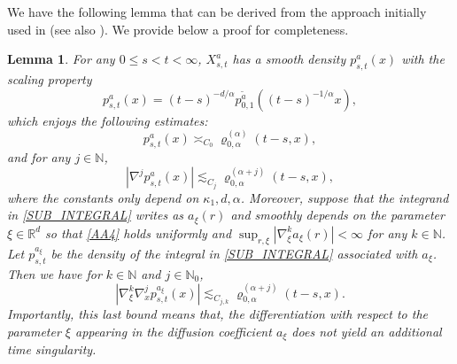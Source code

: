 \documentclass[11pt]{article}
\numberwithin{equation}{section}\providecommand{\asymp}{\mathrel{\sim}}
\theoremstyle{plain}
\newtheorem{lemma}[theorem]{Lemma}
\theoremstyle{definition}
\newcommand\mN{\mathbb{N}}
\newcommand\mR{\mathbb{R}}
\newcommand\1{{\mathbf{1}}}
\begin{document}
We have the following lemma that can be derived from the approach initially used in \cite{Be} (see also
\cite{Bo-Ja}).
We provide below a proof for completeness.
\begin{lemma}\label{Le27}
For any $0\leq s<t<\infty$, $X^a_{s,t}$ has a smooth density $p_{s,t}^{a}(x)$ with the scaling property
\begin{equation}\label{SC0}
p_{s,t}^{a}(x)=(t-s)^{-d/\alpha} p_{0,1}^{\tilde a}((t-s)^{-1/\alpha}x),
\end{equation}
which enjoys the following estimates:
\begin{equation}
p_{s,t}^{a}(x)\asymp_{C_0}\varrho^{(\alpha)}_{0,\alpha}(t-s,x),\label{Es0}
\end{equation}
and for any $j\in\mN$,
\begin{equation}
|\nabla^j p_{s,t}^{a}(x)|\lesssim_{C_j}\varrho^{(\alpha+j)}_{0,\alpha}(t-s,x),\label{Es2}
\end{equation}
where the constants only depend on $\kappa_1,d,\alpha$. Moreover, suppose that the integrand in \eqref{SUB_INTEGRAL} writes as $a_\xi(r)$ and smoothly depends on the parameter $\xi\in\mR^d$ so that \eqref{AA4} holds uniformly and
$\sup_{r,\xi}|\nabla^k_\xi a_\xi(r)|<\infty$ for any $k\in\mN$.
Let $p_{s,t}^{a_\xi}$ be the density of the integral in \eqref{SUB_INTEGRAL} associated with $a_\xi$. Then we have
for $k\in\mN$ and $j\in\mN_0$,
\begin{equation}
|\nabla^k_\xi\nabla^j_x p_{s,t}^{a_\xi}(x)|\lesssim_{C_{j,k}} \varrho^{(\alpha+j)}_{0,\alpha}(t-s,x).\label{Es22}
\end{equation}
Importantly, this last bound means that, the differentiation with respect to the parameter $\xi $ appearing in the \textit{diffusion} coefficient $a_\xi$ does not yield an additional time singularity.
\end{lemma}
\end{document}
